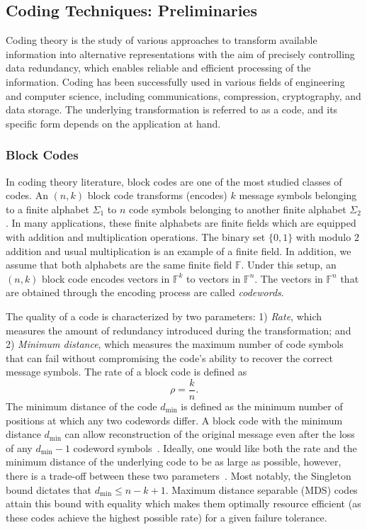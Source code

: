 %
\subsection{Coding Techniques: Preliminaries}
\label{sec:coding_prelims}

Coding theory is the study of various approaches to transform available information into alternative representations with the aim of precisely controlling data redundancy, which enables reliable and efficient processing of the information. Coding has been successfully used in various fields of engineering and computer science, including communications, compression, cryptography, and data storage. The underlying transformation is referred to as a code, and its specific form depends on the application at hand. 

\subsubsection{Block Codes}
\label{sec:block-codes}
In coding theory literature, block codes are one of the most studied classes of codes. An $(n, k)$ block code transforms (encodes) $k$ message symbols belonging to a finite alphabet $\Sigma_1$ to $n$ code symbols belonging to another finite alphabet $\Sigma_2$. In many applications, these finite alphabets are finite fields which are equipped with addition and multiplication operations. The binary set $\{0, 1\}$ with modulo $2$ addition and usual multiplication is an example of a finite field. In addition, we assume that both alphabets are the same finite field $\mathbb{F}$. Under this setup, 
an $(n, k)$ block code encodes vectors in $\mathbb{F}^k$ to vectors in $\mathbb{F}^n$. The vectors in $\mathbb{F}^n$ that are obtained through the encoding process are called {\em codewords}.

The quality of a code is characterized by two parameters: 1) \textit{Rate}, which measures the amount of redundancy introduced during the transformation; and 2) \textit{Minimum distance}, which measures the maximum number of code symbols that can fail without compromising the code's ability to recover the correct message symbols. The rate of a block code is defined as 
$$
\rho = \frac{k}{n}.
$$
The minimum distance of the code $d_{\min}$ is defined as the minimum number of positions at which any two codewords differ. A block code with the minimum distance $d_{\min}$ can allow reconstruction of the original message even after the loss of any $d_{\min} - 1$ codeword symbols~\cite{MacSlo}. Ideally, one would like both the rate and the minimum distance of the underlying code to be as large as possible, however, there is a trade-off between these two parameters~\cite{MacSlo}. Most notably, the Singleton bound dictates that $d_{\min} \leq n-k+1$. Maximum distance separable (MDS) codes attain this bound with equality which makes them optimally resource efficient (as these codes achieve the highest possible rate) for a given failure tolerance. 

